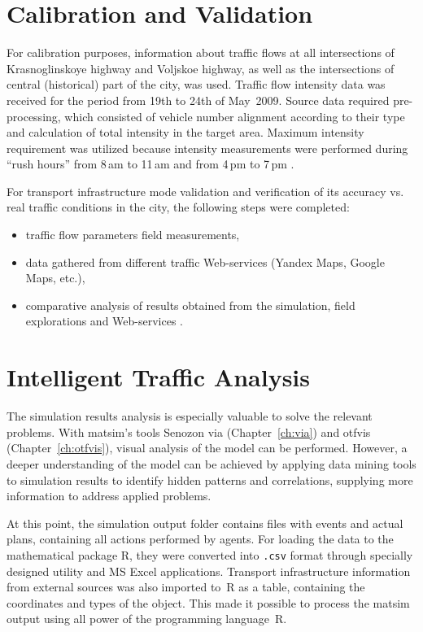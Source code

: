 \section{Calibration and Validation}
For calibration purposes, information about traffic flows at all intersections of Krasnoglinskoye highway and Voljskoe highway, as well as the intersections of central (historical) part of the city, was used. Traffic flow intensity data was received for the period from 19th to 24th of May~2009. Source data required pre-processing, which consisted of vehicle number alignment  according to their type and calculation of total intensity in the target area. Maximum intensity requirement was utilized because intensity measurements were performed during ``rush hours'' from 8\,am to 11\,am and from 4\,pm to 7\,pm \citep[][]{Mikheeva_2008}. 

For transport infrastructure mode validation and verification of its accuracy vs. real traffic conditions in the city, the following steps were completed: 
\begin{itemize}
\item traffic flow parameters field measurements,
\item data gathered from different traffic Web-services (Yandex Maps, Google Maps, etc.),
\item comparative analysis of results obtained from the simulation, field explorations and Web-services \citep[][]{SaprykinaEtAl_2014}.
\end{itemize}

\section{Intelligent Traffic Analysis}
 The simulation results analysis is especially valuable to solve the relevant problems. 
With \gls{matsim}'s tools Senozon \gls{via} (Chapter~\ref{ch:via}) and \gls{otfvis} (Chapter~\ref{ch:otfvis}), visual analysis of the model can be performed. 
However, a deeper understanding of the model can be achieved by applying data mining tools to simulation results to 
identify hidden patterns and correlations, supplying more information to address applied problems. 

At this point, the simulation output folder contains files with events and actual plans, containing all actions performed by agents. For loading the data to the mathematical package R, they were converted into \lstinline|.csv| format through specially designed utility and MS Excel applications. Transport infrastructure information from external sources was also imported to~R as a table, containing the coordinates and types of the object. This made it possible to process the \gls{matsim} output using all power of the programming language~R.

